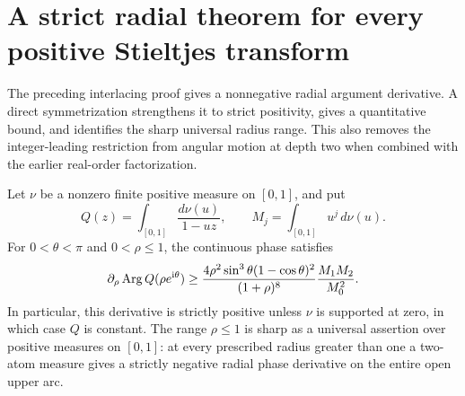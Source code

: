 \section{A strict radial theorem for every positive Stieltjes transform}
\label{radpick:sec:main}
The preceding interlacing proof gives a nonnegative radial argument
derivative. A direct symmetrization strengthens it to strict positivity,
gives a quantitative bound, and identifies the sharp universal radius
range. This also removes the integer-leading restriction from angular
motion at depth two when combined with the earlier real-order factorization.

\begin{theorem}
\label{radpick:thm:strict}
Let $\nu$ be a nonzero finite positive measure on $[0,1]$, and put
\[
 Q(z)=\int_{[0,1]}\frac{d\nu(u)}{1-uz},\qquad
 M_j=\int_{[0,1]}u^j\,d\nu(u).
\]
For $0<\theta<\pi$ and $0<\rho\le1$, the continuous phase satisfies
\begin{equation}\label{radpick:eq:quantitative}
 \partial_\rho\operatorname{Arg} Q(\rho e^{\mathrm{i}\theta})
 \ge \frac{4\rho^2\sin^3\theta(1-\cos\theta)^2}
              {(1+\rho)^8}\frac{M_1M_2}{M_0^2}.
\end{equation}
In particular, this derivative is strictly positive unless $\nu$ is
supported at zero, in which case $Q$ is constant. The range $\rho\le1$
is sharp as a universal assertion over positive measures on $[0,1]$:
at every prescribed radius greater than one a two-atom measure gives
a strictly negative radial phase derivative on the entire open upper arc.
\end{theorem}
